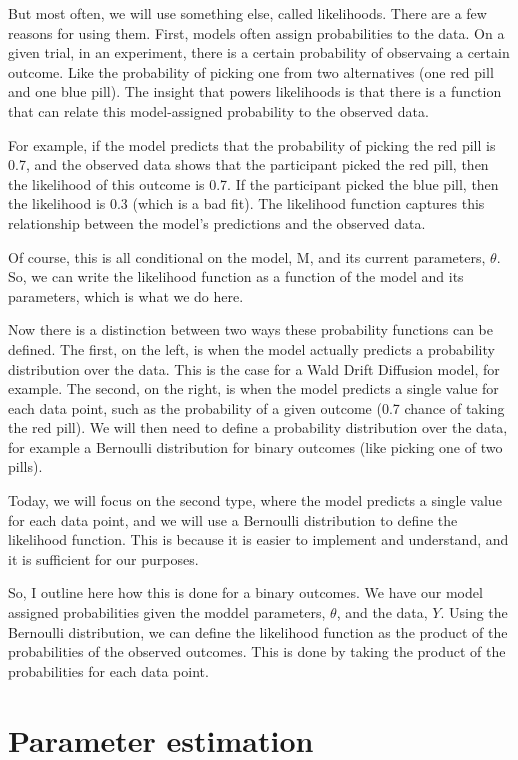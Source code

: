\documentclass[12pt]{article}
\begin{document}
But most often, we will use something else, called likelihoods. There are a few reasons for using them. First, models often assign probabilities to the data. On a given trial, in an experiment, there is a certain probability of observaing a certain outcome. Like the probability of picking one from two alternatives (one red pill and one blue pill). The insight that powers likelihoods is that there is a function that can relate this model-assigned probability to the observed data.

For example, if the model predicts that the probability of picking the red pill is 0.7, and the observed data shows that the participant picked the red pill, then the likelihood of this outcome is 0.7. If the participant picked the blue pill, then the likelihood is 0.3 (which is a bad fit). The likelihood function captures this relationship between the model's predictions and the observed data.

Of course, this is all conditional on the model, M, and its current parameters, $\theta$. So, we can write the likelihood function as a function of the model and its parameters, which is what we do here.

Now there is a distinction between two ways these probability functions can be defined. The first, on the left, is when the model actually predicts a probability distribution over the data. This is the case for a Wald Drift Diffusion model, for example. The second, on the right, is when the model predicts a single value for each data point, such as the probability of a given outcome (0.7 chance of taking the red pill). We will then need to define a probability distribution over the data, for example a Bernoulli distribution for binary outcomes (like picking one of two pills).

Today, we will focus on the second type, where the model predicts a single value for each data point, and we will use a Bernoulli distribution to define the likelihood function. This is because it is easier to implement and understand, and it is sufficient for our purposes.

So, I outline here how this is done for a binary outcomes. We have our model assigned probabilities given the moddel parameters, $\theta$, and the data, $Y$. Using the Bernoulli distribution, we can define the likelihood function as the product of the probabilities of the observed outcomes. This is done by taking the product of the probabilities for each data point.

\section{Parameter estimation}
\end{document}
